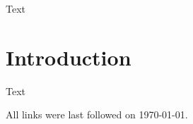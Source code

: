 \documentclass[
a4paper,
twoside,
bibliography=totoc,
headsepline,
cleardoublepage=empty,
parskip=half,
draft=false
]{scrbook}
\begin{document}
		Text
	
	\chapter{Introduction} \label{ch:introduction}
	
		Text
		
	\clearpage
	
	
	
%	
%	
%	
%	
%	
%	
%	
%	
%	
%	
%	
	
	
	
	\printbibliography
	
	All links were last followed on \today.
	
	\pagestyle{empty}
	\renewcommand*{\chapterpagestyle}{empty}
	\Versicherung
\end{document}
